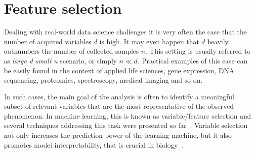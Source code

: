   \section{Feature selection} \label{subsec:feature_selection}
  
%  
	Dealing with real-world data science challenges it is very often the case that the number of acquired variables $d$ is high. It may even happen that $d$ heavily outnumbers the number of collected samples $n$. This setting is usually referred to as \textit{large d small n} scenario, or simply $n \ll d$. Practical examples of this case can be easily found in the context of applied life sciences, \eg gene expression, DNA sequencing, proteomics, spectroscopy, medical imaging and so on.
	
	In such cases, the main goal of the analysis is often to identify a meaningful subset of relevant variables that are the most representative of the observed phenomenon. In machine learning, this is known as variable/feature selection and several techniques addressing this task were presented so far~\cite{guyon2002gene}. Variable selection not only increases the prediction power of the learning machine, but it also promotes model interpretability, that is crucial in biology~\cite{altmann2010permutation}.


